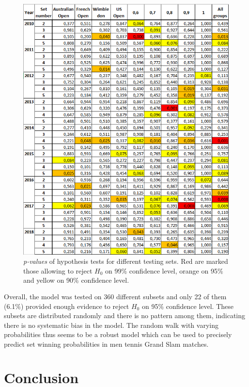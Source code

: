 \documentclass{easychair}
\begin{document}
\begin{figure}
\begin{centering}
\includegraphics[width=1\textwidth]{hypothesis_testing.PNG}\caption{\emph{\label{fig:p-values-of-hypothesis}p-values} of hypothesis tests
for different testing sets. Red are marked those allowing to reject
$H_{0}$ on 99\% confidence level, orange on 95\% and yellow on 90\%
confidence level.}
\par\end{centering}
\centering{}
\end{figure}

Overall, the model was tested on 360 different subsets and only 22
of them (6.1\%) provided enough evidence to reject $H_{0}$ on 95\%
confidence level. These subsets are distributed randomly and there
is no pattern among them, indicating there is no systematic bias in
the model. The random walk with varying probabilities thus seems to
be a robust model which can be used to precisely predict set winning
probabilities in men tennis Grand Slam matches.

\section{Conclusion\label{sec:Conclusion}}
\end{document}

